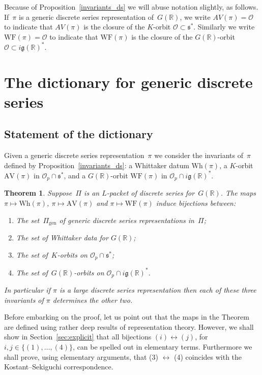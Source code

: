 \documentclass[10pt,leqno]{article}
\newtheorem{theorem}[equation]{Theorem}
\numberwithin{equation}{section}
\renewcommand{\O}{\mathcal O}
\newcommand{\R}{\mathbb R}
\newcommand{\g}{\mathfrak g}
\newcommand{\s}{\mathfrak s}
\newcommand{\AV}{\mathrm{AV}}
\newcommand{\Wh}{\mathrm{Wh}}
\newcommand{\WF}{\mathrm{WF}}
\begin{document}
Because of Proposition~\ref{invariants_ds} we will abuse notation slightly, as follows. If~$\pi$ is a generic discrete series representation of~$G(\R)$, we write $AV(\pi)=\O$ to indicate that $AV(\pi)$ is the closure of the $K$-orbit $\O\subset \s^*$.
Similarly we write $\WF(\pi)=\O$ to indicate that $\WF(\pi)$ is the closure of the $G(\R)$-orbit $\O\subset i\g(\R)^*$.



\section{The dictionary for generic discrete series}


\subsection{Statement of the dictionary}  



Given a generic discrete series representation~$\pi$ we consider the invariants of~$\pi$ defined by Proposition~\ref{invariants_ds}: a Whittaker datum  $\Wh(\pi)$, a $K$-orbit $\AV(\pi)$ in $\mathcal{O}_p \cap \s^*$, and a $G(\R)$-orbit $\WF(\pi)$ in $\mathcal{O}_p \cap  i \g(\R)^*$.


\begin{theorem} \label{th:main} Suppose~$\Pi$ is an $L$-packet of discrete series for~$G(\R)$. 
The maps $\pi \mapsto \Wh(\pi)$, $\pi \mapsto \AV(\pi)$ and $\pi\mapsto \WF(\pi)$ induce bijections between\textup{:}
\begin{enumerate}
\item[(1)] The set~$\Pi_{\mathrm{gen}}$ of generic discrete series representations in~$\Pi$\textup{;}
\item[(2)] The set of Whittaker data for $G(\R)$\textup{;}
\item[(3)] The set of~$K$-orbits on $\mathcal{O}_p \cap \s^*$\textup{;}
\item[(4)] The set of~$G(\R)$-orbits on $\mathcal{O}_p \cap  i \g(\R)^*$\textup{.}
\end{enumerate}
In particular if $\pi$ is a large discrete series representation then each of these three invariants of $\pi$ determines the other two. 
\end{theorem}

Before embarking on the proof, let us point out that the maps in the Theorem are defined using rather deep results of representation theory. However, we shall show in Section~\ref{sec:explicit} that all bijections $(i) \leftrightarrow (j)$, for $i,j \in \{(1), \dots, (4)\}$, can be spelled out in elementary terms. Furthermore we shall prove, using elementary arguments, that (3) $\leftrightarrow$ (4) coincides with the Kostant--Sekiguchi correspondence.  
\end{document}
